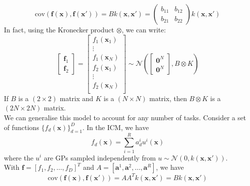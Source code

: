 \documentclass[a4paper,12pt]{article}
\begin{document}
\begin{equation}
    \text{cov}(\mathbf{f}(\mathbf{x}), \mathbf{f}(\mathbf{x'})) = B k(\mathbf{x}, \mathbf{x'}) = 
    \begin{pmatrix}
        b_{11} & b_{12}\\
        b_{21} & b_{22}
    \end{pmatrix} k(\mathbf{x}, \mathbf{x'})
\end{equation}
In fact, using the Kronecker product $\otimes$, we can write:
\begin{equation}
    \begin{bmatrix}
        \mathbf{f}_1\\
        \mathbf{f}_2
    \end{bmatrix} = 
    \begin{bmatrix}
        f_1(\mathbf{x}_1)\\
        \vdots \\
        f_1(\mathbf{x}_N)\\
        f_2(\mathbf{x}_1)\\
        \vdots \\
        f_2(\mathbf{x}_N)\\
    \end{bmatrix} \sim \mathcal{N}\left(
    \begin{bmatrix}
        \mathbf{0}^N\\
        \mathbf{0}^N
    \end{bmatrix}, B \otimes K \right)
\end{equation}
If $B$ is a $(2 \times 2)$ matrix and $K$ is a $(N \times N)$ matrix, then $B \otimes K$ is a $(2N \times 2N)$ matrix.\\
We can generalise this model to account for any number of tasks. Consider a set of functions $\{f_d(\mathbf{x})\}_{d = 1}^D$. In the ICM, we have
\begin{equation}
    f_d(\mathbf{x}) = \sum_{i = 1}^{R} a_d^i u^i(\mathbf{x}) 
\end{equation}
where the $u^i$ are GPs sampled independently from $u \sim \mathcal{N}(0, k(\mathbf{x}, \mathbf{x'}))$.\\
With $\mathbf{f} = [f_1, f_2, \dots, f_D]^T$ and $A = [\mathbf{a}^1, \mathbf{a}^2, \dots, \mathbf{a}^R]$, we have
\begin{equation}
    \text{cov}(\mathbf{f}(\mathbf{x}), \mathbf{f}(\mathbf{x'})) = AA^T k(\mathbf{x}, \mathbf{x'}) = B k(\mathbf{x}, \mathbf{x'})
\end{equation}
\newline
\end{document}
